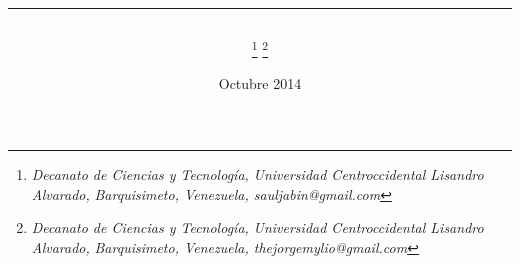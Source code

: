 \documentclass[11pt,twoside,A5]{article}
\begin{document}
\title{
\vspace{-1.1in}
\begin{flushleft}
{\normalsize \begin{center}
\end{center}}
\end{flushleft}
\hrule \vspace{0.5in}{ARQUITECTURA HÍBRIDA DE NAVEGACIÓN PARA ROBOT PIONEER PD3X} }

\author{ 
\footnote{  {\it\scriptsize  Decanato de Ciencias y Tecnolog\'ia,} 
{\it\scriptsize Universidad Centroccidental Lisandro Alvarado,}
{\it\scriptsize Barquisimeto, Venezuela, sauljabin@gmail.com}
}\hspace{1mm}{Saúl Piña}
 \hspace{3mm} 
\footnote{  {\it\scriptsize  Decanato de Ciencias y Tecnolog\'ia,} 
{\it\scriptsize Universidad Centroccidental Lisandro Alvarado,}
{\it\scriptsize Barquisimeto, Venezuela, thejorgemylio@gmail.com}
}\hspace{1mm}{ Jorge Parra} \\
}

\date{\small{Octubre 2014}
}
\end{document}
